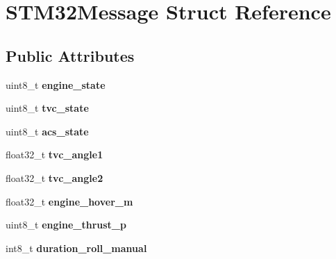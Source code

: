\hypertarget{struct_s_t_m32_message}{}\section{S\+T\+M32\+Message Struct Reference}
\label{struct_s_t_m32_message}
\subsection*{Public Attributes}
\begin{DoxyCompactItemize}
\item 
\mbox{\label{struct_s_t_m32_message_a72ae4dc5fe0a4665b36770b04095900c}} 
uint8\+\_\+t {\bfseries engine\+\_\+state}
\item 
\mbox{\label{struct_s_t_m32_message_aa66da322e2b862a479e46c0f8326cb61}} 
uint8\+\_\+t {\bfseries tvc\+\_\+state}
\item 
\mbox{\label{struct_s_t_m32_message_a6e0fa2e51b8cf025e71e89d116400e45}} 
uint8\+\_\+t {\bfseries acs\+\_\+state}
\item 
\mbox{\label{struct_s_t_m32_message_aeb528e862c3caf1af79048c0a3d5bb40}} 
float32\+\_\+t {\bfseries tvc\+\_\+angle1}
\item 
\mbox{\label{struct_s_t_m32_message_a6f6a9abfdc7bc775043b0a2a7b07c6d9}} 
float32\+\_\+t {\bfseries tvc\+\_\+angle2}
\item 
\mbox{\label{struct_s_t_m32_message_a2095f868e58d9b9c22418b087d640a99}} 
float32\+\_\+t {\bfseries engine\+\_\+hover\+\_\+m}
\item 
\mbox{\label{struct_s_t_m32_message_abdc7926e0e7664083f980cb601038d65}} 
uint8\+\_\+t {\bfseries engine\+\_\+thrust\+\_\+p}
\item 
\mbox{\label{struct_s_t_m32_message_a758bd2eadbc0465b0d7f46be90104f97}} 
int8\+\_\+t {\bfseries duration\+\_\+roll\+\_\+manual}
\item 
\mbox{\label{struct_s_t_m32_message_a87b65eaeddf8751febb74a3218e72074}} 

\end{DoxyCompactItemize}
